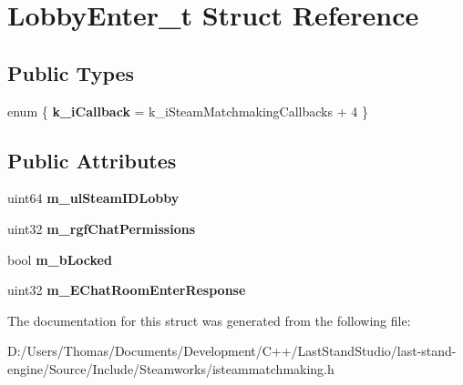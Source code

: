 \hypertarget{structLobbyEnter__t}{}\section{Lobby\+Enter\+\_\+t Struct Reference}
\label{structLobbyEnter__t}
\subsection*{Public Types}
\begin{DoxyCompactItemize}
\item 
\hypertarget{structLobbyEnter__t_ae943b32dd8dd35fdd81e32212d1f6ece}{}enum \{ {\bfseries k\+\_\+i\+Callback} = k\+\_\+i\+Steam\+Matchmaking\+Callbacks + 4
 \}\label{structLobbyEnter__t_ae943b32dd8dd35fdd81e32212d1f6ece}

\end{DoxyCompactItemize}
\subsection*{Public Attributes}
\begin{DoxyCompactItemize}
\item 
\hypertarget{structLobbyEnter__t_a8822d84d62dea65b70ced5660a8a54ab}{}uint64 {\bfseries m\+\_\+ul\+Steam\+I\+D\+Lobby}\label{structLobbyEnter__t_a8822d84d62dea65b70ced5660a8a54ab}

\item 
\hypertarget{structLobbyEnter__t_a3506bc2f8fc4f649e2849cc11e162b2b}{}uint32 {\bfseries m\+\_\+rgf\+Chat\+Permissions}\label{structLobbyEnter__t_a3506bc2f8fc4f649e2849cc11e162b2b}

\item 
\hypertarget{structLobbyEnter__t_acf80dcf9eee12788782f255a2254987a}{}bool {\bfseries m\+\_\+b\+Locked}\label{structLobbyEnter__t_acf80dcf9eee12788782f255a2254987a}

\item 
\hypertarget{structLobbyEnter__t_a2cf1d21f2dc845f7eb0d167b60fa773b}{}uint32 {\bfseries m\+\_\+\+E\+Chat\+Room\+Enter\+Response}\label{structLobbyEnter__t_a2cf1d21f2dc845f7eb0d167b60fa773b}

\end{DoxyCompactItemize}


The documentation for this struct was generated from the following file\+:\begin{DoxyCompactItemize}
\item 
D\+:/\+Users/\+Thomas/\+Documents/\+Development/\+C++/\+Last\+Stand\+Studio/last-\/stand-\/engine/\+Source/\+Include/\+Steamworks/isteammatchmaking.\+h\end{DoxyCompactItemize}
